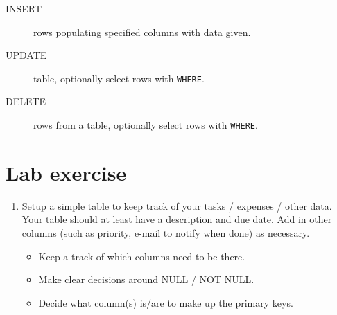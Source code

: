 \begin{description}
\item[INSERT]
  rows populating specified columns with data given.
\item[UPDATE]
  table, optionally select rows with \texttt{WHERE}.
\item[DELETE]
  rows from a table, optionally select rows with \texttt{WHERE}.
\end{description}



\section{Lab exercise}

\begin{enumerate}
\def\labelenumi{\arabic{enumi}.}
\item
  Setup a simple table to keep track of your tasks / expenses / other
  data. Your table should at least have a description and due date. Add
  in other columns (such as priority, e-mail to notify when done) as
  necessary.

  \begin{itemize}
  \item
    Keep a track of which columns need to be there.
  \item
    Make clear decisions around NULL / NOT NULL.
  \item
    Decide what column(s) is/are to make up the primary keys.
  \end{itemize}
\end{enumerate}




